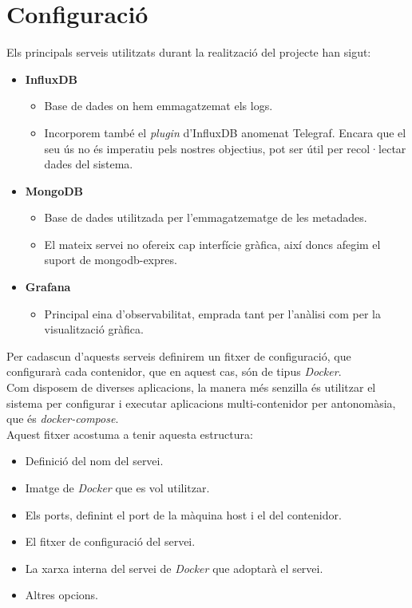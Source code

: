 \clearpage

\section*{Configuració}\label{sec:server-configuration}

Els principals serveis utilitzats durant la realització del projecte han sigut:

\begin{itemize}
    \item \textbf{InfluxDB}
    \begin{itemize}
        \item Base de dades on hem emmagatzemat els logs.
        \item {
            Incorporem també el \textit{\gls{plugin}} d’InfluxDB anomenat Telegraf.
            Encara que el seu ús no és imperatiu pels nostres objectius, pot ser útil per recol·lectar dades del sistema.
        }
    \end{itemize}
    \item \textbf{MongoDB}
    \begin{itemize}
        \item Base de dades utilitzada per l’emmagatzematge de les metadades.
        \item El mateix servei no ofereix cap interfície gràfica, així doncs afegim el suport de mongodb-expres.
    \end{itemize}
    \item \textbf{Grafana}
    \begin{itemize}
        \item Principal eina d’observabilitat, emprada tant per l’anàlisi com per la visualització gràfica.
    \end{itemize}
\end{itemize}

\noindent
Per cadascun d’aquests serveis definirem un fitxer de configuració, que configurarà cada contenidor, que en aquest cas, són de tipus \textit{\gls{Docker}}. \\

\noindent
Com disposem de diverses aplicacions, la manera més senzilla és utilitzar el sistema per configurar i executar aplicacions multi-contenidor per antonomàsia, que és \textit{\gls{docker-compose}}. \\

\noindent
Aquest fitxer acostuma a tenir aquesta estructura:

\begin{itemize}
    \item Definició del nom del servei.
    \item Imatge de \textit{\gls{Docker}} que es vol utilitzar.
    \item Els ports, definint el port de la màquina host i el del contenidor.
    \item El fitxer de configuració del servei.
    \item La xarxa interna del servei de \textit{\gls{Docker}} que adoptarà el servei.
    \item Altres opcions.
\end{itemize}

